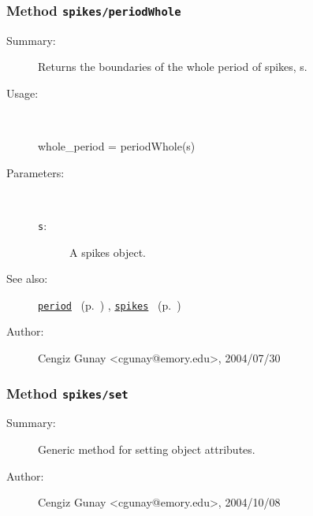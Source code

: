 \subsubsection[Method \texttt{periodWhole}]{Method \texttt{spikes/periodWhole}}%
%
\label{ref_spikes__periodWhole}%
\hypertarget{ref_spikes__periodWhole}{}%
\begin{description}
\item[Summary:]Returns the boundaries of the whole period of spikes, s. 
%
\item[Usage:]~%
\begin{lyxcode}%
whole\_period = periodWhole(s)
%
\end{lyxcode}%
%
%
\item[Parameters:]~
\begin{description}%
\item[\texttt{s}:]
 A spikes object.
\end{description}%
%
%
%
\item[See also:]%
\hyperlink{ref_period}{\texttt{period}}%
\ (p.~\pageref{ref_period})%
%
, \hyperlink{ref_spikes}{\texttt{spikes}}%
\ (p.~\pageref{ref_spikes})%
%
%
\item[Author:]%
Cengiz Gunay <cgunay@emory.edu>, 2004/07/30%
\end{description}
\methodline%
\subsubsection[Method \texttt{set}]{Method \texttt{spikes/set}}%
%
\label{ref_spikes__set}%
\hypertarget{ref_spikes__set}{}%
\begin{description}
\item[Summary:]Generic method for setting object attributes.
%
%
%
%
%
%
%
\item[Author:]%
Cengiz Gunay <cgunay@emory.edu>, 2004/10/08%
\end{description}
\methodline%
